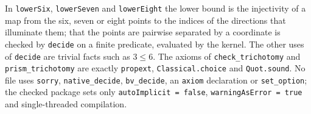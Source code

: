 \documentclass[11pt]{article}
\theoremstyle{definition}
\theoremstyle{remark}
\begin{document}
{\noindent In \texttt{lowerSix}, \texttt{lowerSeven} and \texttt{lowerEight}
the lower bound is the injectivity of a map from the six, seven or eight
points to the indices of the directions that illuminate them; that the points
are pairwise separated by a coordinate is checked by \texttt{decide} on a
finite predicate, evaluated by the kernel. The other uses of \texttt{decide}
are trivial facts such as $3\le6$. The axioms of \texttt{check\_trichotomy}
and \texttt{prism\_trichotomy} are exactly \texttt{propext},
\texttt{Classical.choice} and \texttt{Quot.sound}. No file uses
\texttt{sorry}, \texttt{native\_\allowbreak decide},
\texttt{bv\_\allowbreak decide}, an \texttt{axiom} declaration or
\texttt{set\_option}; the checked package sets only \texttt{autoImplicit = false},
\texttt{warningAsError = true} and single-threaded compilation.

}
\end{document}
